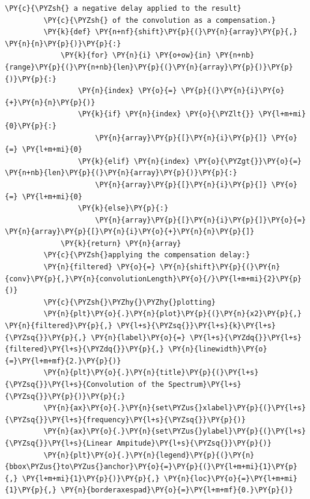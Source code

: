 \begin{Verbatim}[commandchars=\\\{\}]
         \PY{c}{\PYZsh{} a negative delay applied to the result}
         \PY{c}{\PYZsh{} of the convolution as a compensation.}
         \PY{k}{def} \PY{n+nf}{shift}\PY{p}{(}\PY{n}{array}\PY{p}{,} \PY{n}{n}\PY{p}{)}\PY{p}{:}
             \PY{k}{for} \PY{n}{i} \PY{o+ow}{in} \PY{n+nb}{range}\PY{p}{(}\PY{n+nb}{len}\PY{p}{(}\PY{n}{array}\PY{p}{)}\PY{p}{)}\PY{p}{:}
                 \PY{n}{index} \PY{o}{=} \PY{p}{(}\PY{n}{i}\PY{o}{+}\PY{n}{n}\PY{p}{)}
                 \PY{k}{if} \PY{n}{index} \PY{o}{\PYZlt{}} \PY{l+m+mi}{0}\PY{p}{:}
                     \PY{n}{array}\PY{p}{[}\PY{n}{i}\PY{p}{]} \PY{o}{=} \PY{l+m+mi}{0}
                 \PY{k}{elif} \PY{n}{index} \PY{o}{\PYZgt{}}\PY{o}{=} \PY{n+nb}{len}\PY{p}{(}\PY{n}{array}\PY{p}{)}\PY{p}{:}
                     \PY{n}{array}\PY{p}{[}\PY{n}{i}\PY{p}{]} \PY{o}{=} \PY{l+m+mi}{0}
                 \PY{k}{else}\PY{p}{:}
                     \PY{n}{array}\PY{p}{[}\PY{n}{i}\PY{p}{]}\PY{o}{=} \PY{n}{array}\PY{p}{[}\PY{n}{i}\PY{o}{+}\PY{n}{n}\PY{p}{]}
             \PY{k}{return} \PY{n}{array}
         \PY{c}{\PYZsh{}applying the compensation delay:}
         \PY{n}{filtered} \PY{o}{=} \PY{n}{shift}\PY{p}{(}\PY{n}{conv}\PY{p}{,}\PY{n}{convolutionLength}\PY{o}{/}\PY{l+m+mi}{2}\PY{p}{)}
         \PY{c}{\PYZsh{}\PYZhy{}\PYZhy{}plotting}
         \PY{n}{plt}\PY{o}{.}\PY{n}{plot}\PY{p}{(}\PY{n}{x2}\PY{p}{,} \PY{n}{filtered}\PY{p}{,} \PY{l+s}{\PYZsq{}}\PY{l+s}{k}\PY{l+s}{\PYZsq{}}\PY{p}{,} \PY{n}{label}\PY{o}{=} \PY{l+s}{\PYZdq{}}\PY{l+s}{filtered}\PY{l+s}{\PYZdq{}}\PY{p}{,} \PY{n}{linewidth}\PY{o}{=}\PY{l+m+mf}{2.}\PY{p}{)}
         \PY{n}{plt}\PY{o}{.}\PY{n}{title}\PY{p}{(}\PY{l+s}{\PYZsq{}}\PY{l+s}{Convolution of the Spectrum}\PY{l+s}{\PYZsq{}}\PY{p}{)}\PY{p}{;}
         \PY{n}{ax}\PY{o}{.}\PY{n}{set\PYZus{}xlabel}\PY{p}{(}\PY{l+s}{\PYZsq{}}\PY{l+s}{frequency}\PY{l+s}{\PYZsq{}}\PY{p}{)}
         \PY{n}{ax}\PY{o}{.}\PY{n}{set\PYZus{}ylabel}\PY{p}{(}\PY{l+s}{\PYZsq{}}\PY{l+s}{Linear Ampitude}\PY{l+s}{\PYZsq{}}\PY{p}{)}
         \PY{n}{plt}\PY{o}{.}\PY{n}{legend}\PY{p}{(}\PY{n}{bbox\PYZus{}to\PYZus{}anchor}\PY{o}{=}\PY{p}{(}\PY{l+m+mi}{1}\PY{p}{,} \PY{l+m+mi}{1}\PY{p}{)}\PY{p}{,} \PY{n}{loc}\PY{o}{=}\PY{l+m+mi}{1}\PY{p}{,} \PY{n}{borderaxespad}\PY{o}{=}\PY{l+m+mf}{0.}\PY{p}{)}
\end{Verbatim}


